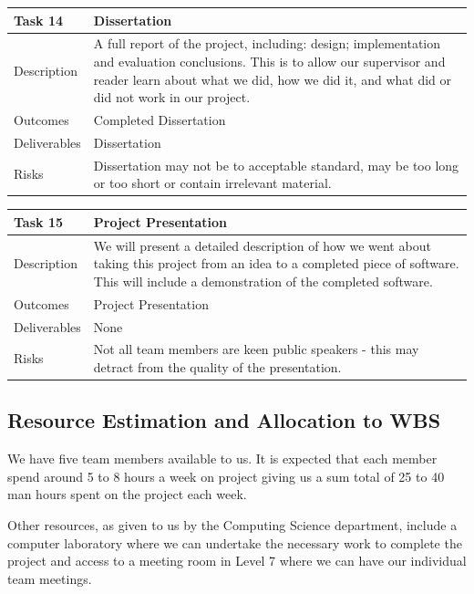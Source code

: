 \documentclass{l3proj}
\begin{document}
\begin{center}
    \begin{tabular}{ | l | p{12cm} |}
    \hline	
    Task 14 & Dissertation \\ \hline
    Description & A full report of the project, including: design; implementation and evaluation conclusions. This is to allow our supervisor and reader learn about what we did, how we did it, and what did or did not work in our project. \\ \hline   
    Outcomes & Completed Dissertation \\ \hline
    Deliverables & Dissertation \\ \hline
    Risks & Dissertation may not be to acceptable standard, may be too long or too short or contain irrelevant material. \\ 
    \hline
    \end{tabular}
\end{center}

\begin{center}
    \begin{tabular}{ | l | p{12cm} |}
    \hline	
    Task 15 & Project Presentation \\ \hline
    Description & We will present a detailed description of how we went about taking this project from an idea to a completed piece of software. This will include a demonstration of the completed software. \\ \hline   
    Outcomes & Project Presentation \\ \hline
    Deliverables & None \\ \hline
    Risks & Not all team members are keen public speakers - this may detract from the quality of the presentation. \\ 
    \hline
    \end{tabular}
\end{center}

\subsection{Resource Estimation and Allocation to WBS}
We have five team members available to us. It is expected that each member spend around 5 to 8 hours a week on project giving us a sum total of 25 to 40 man hours spent on the project each week.

Other resources, as given to us by the Computing Science department, include a computer laboratory where we can undertake the necessary work to complete the project and access to a meeting room in Level 7 where we can have our individual team meetings.
\end{document}
